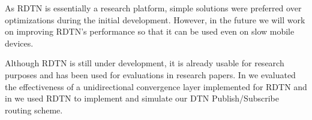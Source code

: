\documentclass[a4paper]{article}
\begin{document}
As RDTN is essentially a research platform, simple solutions were preferred over
optimizations during the initial development. However, in the future we will
work on improving RDTN's performance so that it can be used even on slow mobile
devices.

Although RDTN is still under development, it is already usable for research
purposes and has been used for evaluations in research papers.  In \cite{nsdr07}
we evaluated the effectiveness of a unidirectional convergence layer implemented
for RDTN and in \cite{dtn-pubsub} we used RDTN to implement and simulate our DTN
Publish/Subscribe routing scheme.


\end{document}
